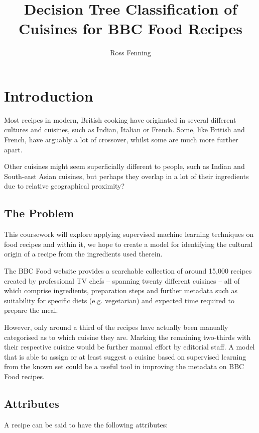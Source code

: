 \documentclass[11pt,a4paper]{article}
\title{Decision Tree Classification of Cuisines for BBC Food Recipes}
\author{Ross Fenning}
\begin{document}
\maketitle

\section{Introduction}

Most recipes in modern, British cooking have
originated in several different cultures and cuisines, such as Indian,
Italian or French. Some, like British and French, have arguably a lot
of crossover, whilst some are much more further apart.

Other cuisines might seem superficially different to people, such as Indian and
South-east Asian cuisines, but perhaps they overlap in a lot of their
ingredients due to relative geographical proximity?

\subsection{The Problem}

This coursework will explore applying supervised machine learning
techniques on food recipes and within it, we hope to create a model for
identifying the cultural origin of a recipe from the ingredients used
therein.

The BBC Food website provides a searchable collection of around 15,000
recipes created by professional TV chefs -- spanning twenty different
cuisines -- all of which comprise ingredients, preparation steps and
further metadata such as suitability for specific diets (e.g.
vegetarian) and expected time required to prepare the meal.

However, only around a third of the recipes have actually been manually
categorised as to which cuisine they are. Marking the remaining
two-thirds with their respective cuisine would be further manual effort
by editorial staff. A model that is able to assign or at least suggest
a cuisine based on supervised learning from the known set could be a useful
tool in improving the metadata on BBC Food recipes.

\subsection{Attributes}

A recipe can be said to have the following attributes:
\end{document}
